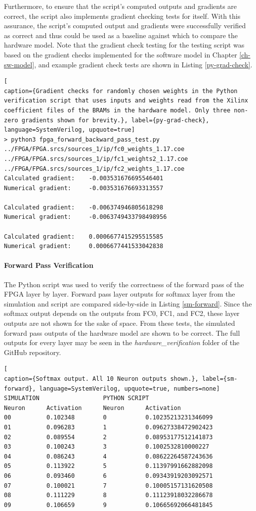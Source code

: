 Furthermore, to ensure that the script's computed outputs and gradients are correct, the script also implements gradient checking tests for itself. With this assurance,  the script's computed output and gradients were successfully verified as correct and thus could be used as a baseline against which to compare the hardware model. Note that the gradient check testing for the testing script was based on the gradient checks implemented for the software model in Chapter \ref{ch-sw-model}, and example gradient check tests are shown in Listing \ref{py-grad-check}.

\begin{lstlisting}[
caption={Gradient checks for randomly chosen weights in the Python verification script that uses inputs and weights read from the Xilinx coefficient files of the BRAMs in the hardware model. Only three non-zero gradients shown for brevity.}, label={py-grad-check}, language=SystemVerilog, upquote=true]
> python3 fpga_forward_backward_pass_test.py
../FPGA/FPGA.srcs/sources_1/ip/fc0_weights_1.17.coe
../FPGA/FPGA.srcs/sources_1/ip/fc1_weights2_1.17.coe
../FPGA/FPGA.srcs/sources_1/ip/fc2_weights_1.17.coe
Calculated gradient:    -0.003531676695546401
Numerical gradient:     -0.003531676693313557

Calculated gradient:    -0.006374946805618298
Numerical gradient:     -0.0063749433798498956

Calculated gradient:    0.0006677415295515585
Numerical gradient:     0.0006677441533042838
\end{lstlisting}

\paragraph{Forward Pass Verification}
The Python script was used to verify the correctness of the forward pass of the FPGA layer by layer. Forward pass layer outputs for softmax layer from the simulation and script are compared side-by-side in Listing \ref{sm-forward}. Since the softmax output depends on the outputs from FC0, FC1, and FC2, these layer outputs are not shown for the sake of space. From these tests, the simulated forward pass outputs of the hardware model are shown to be correct. The full outputs for every layer may be seen in the \textit{hardware\_verification} folder of the GitHub repository.

\begin{lstlisting}[
caption={Softmax output. All 10 Neuron outputs shown.}, label={sm-forward}, language=SystemVerilog, upquote=true, numbers=none]
SIMULATION                  PYTHON SCRIPT
Neuron		Activation      Neuron		Activation
00			0.102348        0			0.10235213231346099
01			0.096283        1			0.09627338472902423
02			0.089554        2			0.08953177512141873
03			0.100243        3			0.1002532810000227
04			0.086243        4			0.08622264587243636
05			0.113922        5			0.11397991662882098
06			0.093460        6			0.09343919203092571
07			0.100021        7			0.10005157131620508
08			0.111229        8			0.11123918032286678
09			0.106659        9			0.10665692066481845
\end{lstlisting}

